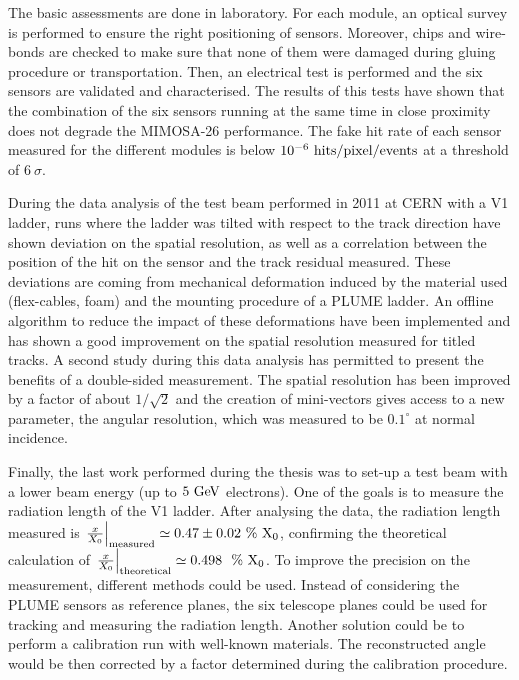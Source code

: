 The basic assessments are done in laboratory.
For each module, an optical survey is performed to ensure the right positioning of sensors.
Moreover, chips and wire-bonds are checked to make sure that none of them were damaged during gluing procedure or transportation.
Then, an electrical test is performed and the six sensors are validated and characterised.
The results of this tests have shown that the combination of the six sensors running at the same time in close proximity does not degrade the \gls{MIMOSA}-26 performance.
The fake hit rate of each sensor measured for the different modules is below $10^{-6}~\rm{hits/pixel/events}$ at a threshold of $6~\sigma$.

During the data analysis of the test beam performed in 2011 at \gls{CERN} with a V1 ladder, runs where the ladder was tilted with respect to the track direction have shown deviation on the spatial resolution, as well as a correlation between the position of the hit on the sensor and the track residual measured.
These deviations are coming from mechanical deformation induced by the material used (flex-cables, foam) and the mounting procedure of a \gls{PLUME} ladder.
An offline algorithm to reduce the impact of these deformations have been implemented and has shown a good improvement on the spatial resolution measured for titled tracks.
A second study during this data analysis has permitted to present the benefits of a double-sided measurement. 
The spatial resolution has been improved by a factor of about $1/\sqrt{2}$ and the creation of mini-vectors gives access to a new parameter, the angular resolution, which was measured to be $0.1^{\circ}$ at normal incidence.

Finally, the last work performed during the thesis was to set-up a test beam with a lower beam energy (up to $5~\rm{GeV}$ electrons).
One of the goals is to measure the radiation length of the V1 ladder.
After analysing the data, the radiation length measured is $\left. \frac{x}{X_0} \right|_{\rm{measured}} \simeq 0.47 \pm 0.02~\%~\rm{X_0}$, confirming the theoretical calculation of $\left. \frac{x}{X_0}\right|_{\rm{theoretical}} \simeq 0.498~~\%~\rm{X_0}$.
To improve the precision on the measurement, different methods could be used.
Instead of considering the \gls{PLUME} sensors as reference planes, the six telescope planes could be used for tracking and measuring the radiation length.
Another solution could be to perform a calibration run with well-known materials. 
The reconstructed angle would be then corrected by a factor determined during the calibration procedure.


